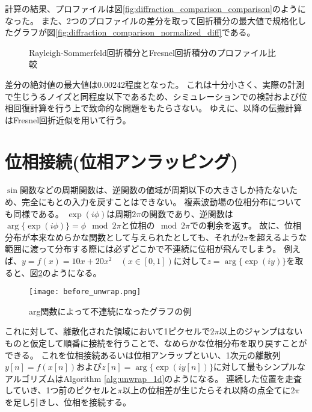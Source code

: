 計算の結果、プロファイルは図\ref{fig:diffraction_comparison_comparison}のようになった。
また、2つのプロファイルの差分を取って回折積分の最大値で規格化したグラフが図\ref{fig:diffraction_comparison_normalized_diff}である。

\begin{figure}[!ht]
\centering


\caption[]{Rayleigh-Sommerfeld回折積分とFresnel回折積分のプロファイル比較}
\label{fig:diffraction_comparison}
\end{figure}

差分の絶対値の最大値は0.00242程度となった。
これは十分小さく、実際の計測で生じうるノイズと同程度以下であるため、シミュレーションでの検討および位相回復計算を行う上で致命的な問題をもたらさない。
ゆえに、以降の伝搬計算はFresnel回折近似を用いて行う。


\clearpage
\newpage

\section{位相接続(位相アンラッピング)}
$\sin$関数などの周期関数は、逆関数の値域が周期以下の大きさしか持たないため、完全にもとの入力を戻すことはできない。
複素波動場の位相分布についても同様である。
$\exp(i\phi)$は周期$2\pi$の関数であり、逆関数は$\arg\{\exp(i\phi)\}=\phi \mod{2\pi}$と位相の$\mod{2\pi}$での剰余を返す。
故に、位相分布が本来なめらかな関数として与えられたとしても、それが$2\pi$を超えるような範囲に渡って分布する際には必ずどこかで不連続に位相が飛んでしまう。
例えば、$y = f(x) = 10x + 20x^2 \quad (x \in [0, 1])$に対して$z = \arg\{\exp(iy)\}$を取ると、図\ref{fig:wrapped_graph_example}のようになる。

\begin{figure}[ht]
\centering
\texttt{[image: before\_unwrap.png]}
\caption{arg関数によって不連続になったグラフの例}
\label{fig:wrapped_graph_example}
\end{figure}

これに対して、離散化された領域において1ピクセルで$2\pi$以上のジャンプはないものと仮定して順番に接続を行うことで、なめらかな位相分布を取り戻すことができる。
これを位相接続あるいは位相アンラップといい、1次元の離散列$y[n] = f(x[n])$および$z[n]=\arg\{\exp(iy[n])\}$に対して最もシンプルなアルゴリズムはAlgorithm \ref{alg:unwrap_1d}のようになる。
連続した位置を走査していき、1つ前のピクセルと$\pi$以上の位相差が生じたらそれ以降の点全てに$2\pi$を足し引きし、位相を接続する。

